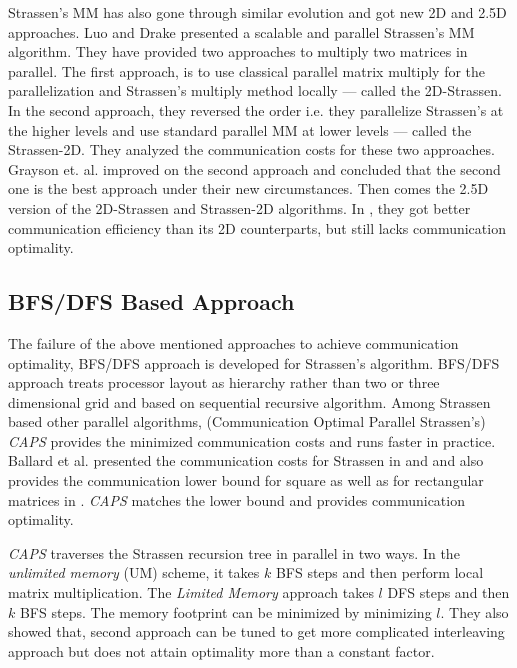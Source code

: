 Strassen's MM has also gone through similar evolution and got new 2D and 2.5D approaches. Luo and Drake \cite{luo1995scalable} presented a scalable and parallel Strassen's MM algorithm. They have provided two approaches to multiply two matrices in parallel. The first approach, is to use classical parallel matrix multiply for the parallelization and Strassen's multiply method locally --- called the 2D-Strassen. In the second approach, they reversed the order i.e. they parallelize Strassen's at the higher levels and use standard parallel MM at lower levels --- called the Strassen-2D. They analyzed the communication costs for these two approaches. Grayson et. al. \cite{grayson1996high} improved on the second approach and concluded that the second one is the best approach under their new circumstances. Then comes the 2.5D version of the 2D-Strassen and Strassen-2D algorithms. In \cite{solomonik2011improving}, they got better communication efficiency than its 2D counterparts, but still lacks communication optimality.

\subsection{BFS/DFS Based Approach}
The failure of the above mentioned approaches to achieve communication optimality, BFS/DFS approach is developed \cite{ballard2012communication} for Strassen's algorithm. BFS/DFS approach treats processor layout as hierarchy rather than two or three dimensional grid and based on sequential recursive algorithm. Among Strassen based other parallel algorithms, (Communication Optimal Parallel Strassen's) \textit{CAPS} \cite{lipshitz2012communication} provides the minimized communication costs and runs faster in practice. Ballard et al. presented the communication costs for Strassen in \cite{ballard2012graph} and \cite{ballard2012communication} and also provides the communication lower bound for square as well as for rectangular matrices in \cite{demmel2013communication}. \textit{CAPS} matches the lower bound and provides communication optimality. 

\textit{CAPS} traverses the Strassen recursion tree in parallel in two ways. In the \textit{unlimited memory} (UM) scheme, it takes $k$ BFS steps and then perform local matrix multiplication. The \textit{Limited Memory} approach takes $l$ DFS steps and then $k$ BFS steps. The memory footprint can be minimized by minimizing $l$. They also showed that, second approach can be tuned to get more complicated interleaving approach but does not attain optimality more than a constant factor.

